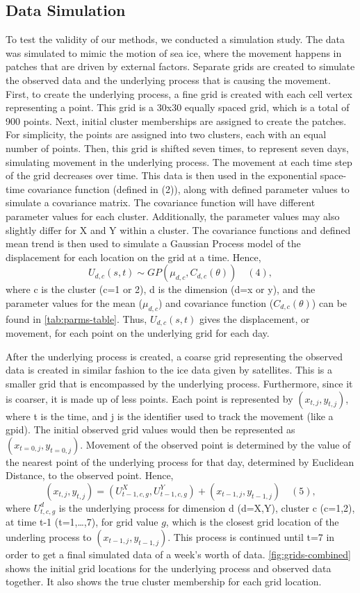 \documentclass[12pt]{article}
\begin{document}
\hypertarget{data-simulation}{%
\subsection{Data Simulation}\label{data-simulation}}

To test the validity of our methods, we conducted a simulation study.
The data was simulated to mimic the motion of sea ice, where the
movement happens in patches that are driven by external factors.
Separate grids are created to simulate the observed data and the
underlying process that is causing the movement. First, to create the
underlying process, a fine grid is created with each cell vertex
representing a point. This grid is a 30x30 equally spaced grid, which is
a total of 900 points. Next, initial cluster memberships are assigned to
create the patches. For simplicity, the points are assigned into two
clusters, each with an equal number of points. Then, this grid is
shifted seven times, to represent seven days, simulating movement in the
underlying process. The movement at each time step of the grid decreases
over time. This data is then used in the exponential space-time
covariance function (defined in (2)), along with defined parameter
values to simulate a covariance matrix. The covariance function will
have different parameter values for each cluster. Additionally, the
parameter values may also slightly differ for X and Y within a cluster.
The covariance functions and defined mean trend is then used to simulate
a Gaussian Process model of the displacement for each location on the
grid at a time.
Hence,\[ U_{d,c}(s,t) \sim GP(\mu_{d,c}, C_{d,c}(\theta)) \quad (4),\]
where c is the cluster (c=1 or 2), d is the dimension (d=x or y), and
the parameter values for the mean (\(\mu_{d,c}\)) and covariance
function (\(C_{d,c}(\theta)\)) can be found in \cref{tab:parms-table}.
Thus, \(U_{d,c}(s,t)\) gives the displacement, or movement, for each
point on the underlying grid for each day.

After the underlying process is created, a coarse grid representing the
observed data is created in similar fashion to the ice data given by
satellites. This is a smaller grid that is encompassed by the underlying
process. Furthermore, since it is coarser, it is made up of less points.
Each point is represented by \((x_{t,j}, y_{t,j})\), where t is the
time, and j is the identifier used to track the movement (like a gpid).
The initial observed grid values would then be represented as
\((x_{t=0,j}, y_{t=0,j})\). Movement of the observed point is determined
by the value of the nearest point of the underlying process for that
day, determined by Euclidean Distance, to the observed point. Hence,
\[(x_{t,j}, y_{t,j}) = (U^{X}_{t-1,c,g}, U^{Y}_{t-1,c,g}) + (x_{t-1,j}, y_{t-1,j}) \quad (5),\]
where \(U^d_{t,c,g}\) is the underlying process for dimension d (d=X,Y),
cluster c (c=1,2), at time t-1 (t=1,\ldots,7), for grid value \(g\),
which is the closest grid location of the underling process to
\((x_{t-1,j}, y_{t-1,j})\). This process is continued until t=7 in order
to get a final simulated data of a week's worth of data.
\cref{fig:grids-combined} shows the initial grid locations for the
underlying process and observed data together. It also shows the true
cluster membership for each grid location.
\end{document}
